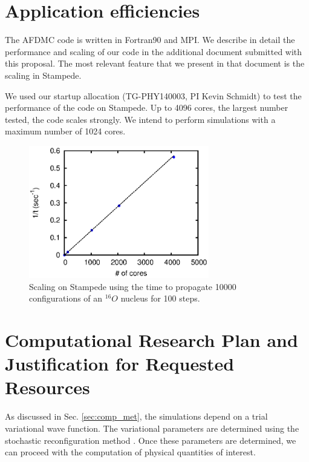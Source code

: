 \documentclass[12pt,letterpaper]{article}
\begin{document}
\section{Application efficiencies}

The AFDMC code is written in Fortran90 and MPI. We describe in detail the 
performance and scaling of our code in the additional document submitted 
with this proposal. The most relevant feature that we present in that 
document is the scaling in Stampede.

We used our startup allocation (TG-PHY140003, PI Kevin Schmidt) to test the 
performance of the code on Stampede. Up to 4096 cores, the 
largest number tested, the code scales strongly. We intend to perform 
simulations with a maximum number of 1024 cores.

\begin{figure}[h]
   \centering
   \includegraphics[width=0.7\textwidth]{stampede}
   \caption{Scaling on Stampede using the time to propagate 10000 configurations of an $^{16}O$ nucleus for 100 steps.}
   \label{fig:scaling}
\end{figure}

\section{Computational Research Plan and Justification for Requested 
Resources}

As discussed in Sec. \ref{sec:comp_met}, the simulations depend on a trial 
variational wave function. The variational parameters are determined using 
the stochastic reconfiguration method \cite{cas04}. Once these parameters 
are determined, we can proceed with the computation of physical quantities 
of interest.

\end{document}
